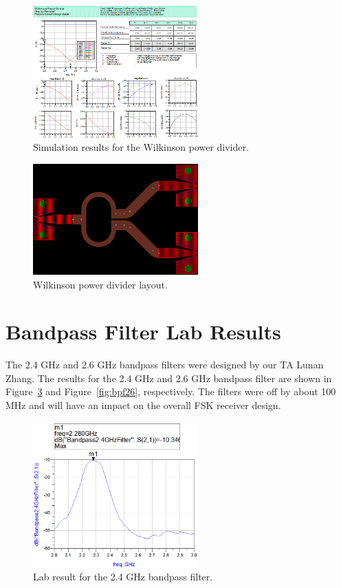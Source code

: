 \documentclass[conference]{IEEEtran}
\begin{document}
\begin{figure}[!htb]
\centering
\includegraphics[width=2.5in]{wilkinson-pics/wilkinson-simulation.png}
\caption{Simulation results for the Wilkinson power divider.}
\label{fig:WDSim}
\end{figure}

\begin{figure}[!htb]
\centering
\includegraphics[width=2.5in]{wilkinson-pics/wilkinson-layout.png}
\caption{Wilkinson power divider layout.}
\label{fig:WDLayout}
\end{figure}

\section{Bandpass Filter Lab Results}
The 2.4 GHz and 2.6 GHz bandpass filters were designed by our TA Lunan Zhang\cite{lunan}.  The results for the 2.4 GHz and 2.6 GHz bandpass filter are shown in Figure~\ref{fig:bpf24} and Figure~\ref{fig:bpf26}, respectively.  The filters were off by about 100 MHz and will have an impact on the overall FSK receiver design.

\begin{figure}[!htb]
\centering
\includegraphics[width=2.5in]{bandpass-pics/bpf24.png}
\caption{Lab result for the 2.4 GHz bandpass filter.}
\label{fig:bpf24}
\end{figure}
\end{document}
